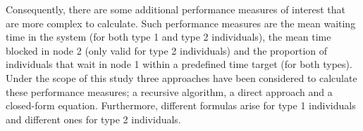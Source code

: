 Consequently, there are some additional performance measures of interest that
are more complex to calculate.
Such performance measures are the mean waiting time in the system (for both
type 1 and type 2 individuals), the mean time blocked in node 2 (only
valid for type 2 individuals) and the proportion of individuals that wait in
node 1 within a predefined time target (for both types).
Under the scope of this study three approaches have been considered to calculate
these performance measures; a recursive algorithm, a direct approach and
a closed-form equation. 
Furthermore, different formulas arise for type 1 individuals and different
ones for type 2 individuals.






